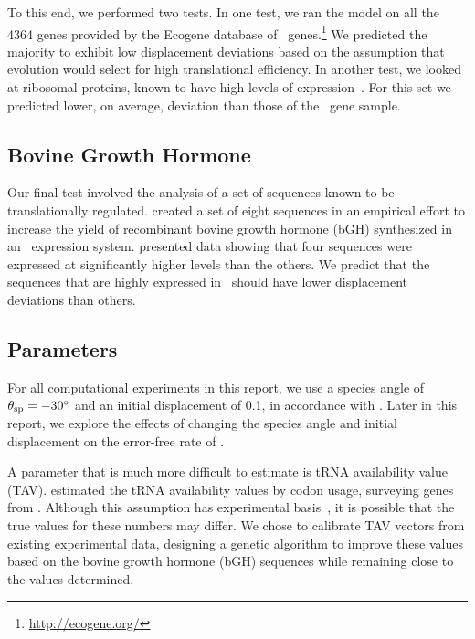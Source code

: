 \documentclass[12pt]{article}
\begin{document}
To this end, we performed two tests. In one test, we ran the model on
all the 4364 genes provided by the Ecogene database of
\ecoli\ genes.\footnote{\url{http://ecogene.org/}}
We predicted the majority to exhibit low
displacement deviations based on the assumption that evolution would select
for high translational efficiency. In another
test, we looked at ribosomal proteins, known to have high levels of
expression~\cite{rpoS:process}. For this set we predicted lower, on average,
deviation than those of the \ecoli\ gene sample.
	
\subsection{Bovine Growth Hormone}
Our final test involved the analysis of a set of sequences known to 
be translationally regulated.  \citet{schoner:bgh} created a set 
of eight sequences in an empirical effort to increase the yield 
of recombinant bovine growth hormone (bGH) synthesized in an 
\ecoli\ expression system. \citeauthor{schoner:bgh} 
presented data showing that 
four sequences were expressed 
at significantly higher levels than the others. We predict that 
the sequences that are highly expressed in \ecoli\ should have 
lower displacement deviations than others.

\subsection{Parameters}
\label{section:parameters}
For all computational experiments in this report, we use a species
angle of $\theta_{\rm{sp}} = -30^\circ$ and an initial displacement of 0.1,
in accordance with \citet{lalit:mechanics}.
Later in this report, we explore
the effects of changing the species angle and initial displacement on the
error-free rate of \prfB.

A parameter that is much more difficult to estimate
is tRNA availability value (TAV).
\citeauthor{lalit:mechanics} estimated the tRNA availability values by codon usage, 
surveying genes from \ecoli.
Although this assumption has experimental basis~\cite{ikemura}, 
it is possible that the true values for these numbers may differ.
We chose to calibrate TAV vectors from existing experimental data, 
designing a genetic algorithm to improve these values based on 
the bovine growth hormone (bGH) sequences while remaining close 
to the values \citeauthor{lalit:mechanics} determined.
\end{document}
